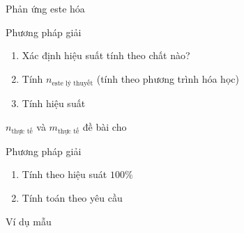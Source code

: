 \begin{dangntd}{Phản ứng este hóa}
	\begin{ntdppg}{Phương pháp giải}
		\begin{enumerate}[label=\itshape\sffamily{Bước \arabic*},leftmargin=6pt,wide=3pt]
		\item Xác định hiệu suất tính theo chất nào?
		\item Tính $ n_{\text{este lý thuyết}} $ (tính theo phương trình hóa học)
		\item Tính hiệu suất
		\end{enumerate}
	\end{ntdppg}
\begin{notegsnd}
	$ n_{\text{thực tế}} $ và $ m_{\text{thực tế}} $ đề bài cho
\end{notegsnd}
\begin{ntdppg}{Phương pháp giải}
	\begin{enumerate}[label=\itshape\sffamily{Bước \arabic*},leftmargin=6pt,wide=3pt]
		\item Tính theo hiệu suát $ 100 \% $
		\item Tính toán theo yêu cầu
		
		
		
		
	\end{enumerate}
\end{ntdppg}
\end{dangntd}
\begin{vdm}{Ví dụ mẫu}
\end{vdm}
